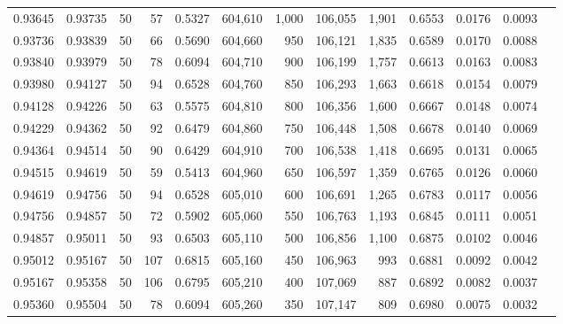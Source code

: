 \begin{tabular}{rrrrrrrrrrrrr}
0.93645 & 0.93735 &    50 &  57 &                                     0.5327 & 604,610 &   1,000 & 106,055 &   1,901 & 0.6553 & 0.0176 & 0.0093 \\
0.93736 & 0.93839 &    50 &  66 &                                     0.5690 & 604,660 &     950 & 106,121 &   1,835 & 0.6589 & 0.0170 & 0.0088 \\
0.93840 & 0.93979 &    50 &  78 &                                     0.6094 & 604,710 &     900 & 106,199 &   1,757 & 0.6613 & 0.0163 & 0.0083 \\
0.93980 & 0.94127 &    50 &  94 &                                     0.6528 & 604,760 &     850 & 106,293 &   1,663 & 0.6618 & 0.0154 & 0.0079 \\
0.94128 & 0.94226 &    50 &  63 &                                     0.5575 & 604,810 &     800 & 106,356 &   1,600 & 0.6667 & 0.0148 & 0.0074 \\
0.94229 & 0.94362 &    50 &  92 &                                     0.6479 & 604,860 &     750 & 106,448 &   1,508 & 0.6678 & 0.0140 & 0.0069 \\
0.94364 & 0.94514 &    50 &  90 &                                     0.6429 & 604,910 &     700 & 106,538 &   1,418 & 0.6695 & 0.0131 & 0.0065 \\
0.94515 & 0.94619 &    50 &  59 &                                     0.5413 & 604,960 &     650 & 106,597 &   1,359 & 0.6765 & 0.0126 & 0.0060 \\
0.94619 & 0.94756 &    50 &  94 &                                     0.6528 & 605,010 &     600 & 106,691 &   1,265 & 0.6783 & 0.0117 & 0.0056 \\
0.94756 & 0.94857 &    50 &  72 &                                     0.5902 & 605,060 &     550 & 106,763 &   1,193 & 0.6845 & 0.0111 & 0.0051 \\
0.94857 & 0.95011 &    50 &  93 &                                     0.6503 & 605,110 &     500 & 106,856 &   1,100 & 0.6875 & 0.0102 & 0.0046 \\
0.95012 & 0.95167 &    50 & 107 &                                     0.6815 & 605,160 &     450 & 106,963 &     993 & 0.6881 & 0.0092 & 0.0042 \\
0.95167 & 0.95358 &    50 & 106 &                                     0.6795 & 605,210 &     400 & 107,069 &     887 & 0.6892 & 0.0082 & 0.0037 \\
0.95360 & 0.95504 &    50 &  78 &                                     0.6094 & 605,260 &     350 & 107,147 &     809 & 0.6980 & 0.0075 & 0.0032 \\

\end{tabular}
